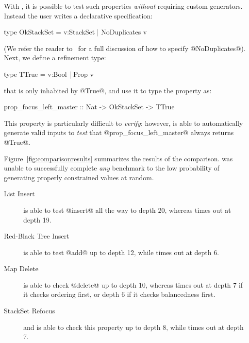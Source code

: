 With \toolname, it is possible to test such properties \emph{without} 
requiring custom generators. Instead the user writes a declarative 
specification:
%
\begin{code}
  type OkStackSet = {v:StackSet | NoDuplicates v}
\end{code}
%
(We refer the reader to~\cite{VazouRealWorld14} for a full 
discussion of how to specify @NoDuplicates@).
%
Next, we define a refinement type:
%
\begin{code}
  type TTrue = {v:Bool | Prop v}
\end{code}
%
that is only inhabited by @True@, and use it to type the \quickcheck 
property as:
%
\begin{code}
  prop_focus_left_master :: Nat -> OkStackSet -> TTrue 
\end{code}
%
This property is particularly difficult to \emph{verify}; however,
\toolname is able to automatically
generate valid inputs to \emph{test} that @prop_focus_left_master@
always returns @True@.



%
Figure~\ref{fig:comparisonresults} summarizes the results of the comparison.
%
\quickcheck was unable to successfully complete \emph{any} 
benchmark to the low probability of generating properly 
constrained values at random.

\begin{description}
\item[List Insert] \toolname is able to test @insert@ all the way to 
   depth 20, whereas \lazysmallcheck times out at depth 19.

\item[Red-Black Tree Insert] \toolname is able to test @add@ up to depth 12,
  while \lazysmallcheck times out at depth 6.
  
\item[Map Delete] \toolname is able to check @delete@ up to depth 10, whereas
   \lazysmallcheck times out at depth 7 if it checks ordering first,
    or depth 6 if it checks balancedness first.

\item[StackSet Refocus] \toolname and is able to check this property 
    up to depth 8, while \lazysmallcheck times out at depth 7.
\end{description}

